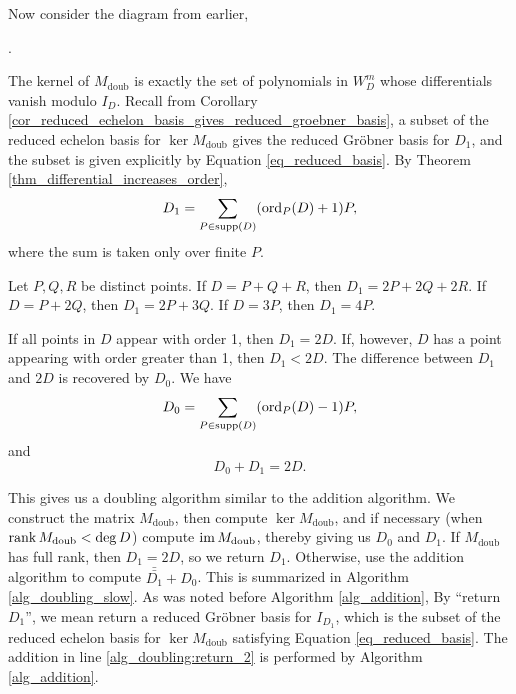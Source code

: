 Now consider the diagram from earlier,
\begin{center}
  .
\end{center}
The kernel of $M_{\text{doub}}$ is exactly the set of polynomials in $W_D^m$ whose differentials vanish modulo $I_D$.
Recall from Corollary \ref{cor_reduced_echelon_basis_gives_reduced_groebner_basis},
a subset of the reduced echelon basis for $\ker M_{\text{doub}}$ gives the reduced Gr\"obner basis for $D_1$,
and the subset is given explicitly by Equation \ref{eq_reduced_basis}.
By Theorem \ref{thm_differential_increases_order},
\[ D_1 = \sum_{P \in \operatorname{supp}(D)} (\operatorname{ord}_P(D) + 1)P, \]
where the sum is taken only over finite $P$.
\begin{example}
  Let $P,Q,R$ be distinct points.
  If $D = P + Q + R$, then $D_1 = 2P + 2Q + 2R$.
  If $D = P + 2Q$, then $D_1 = 2P + 3Q$.
  If $D = 3P$, then $D_1 = 4P$.
\end{example}

If all points in $D$ appear with order 1, then $D_1 = 2D$.
If, however, $D$ has a point appearing with order greater than 1, then $D_1 < 2D$.
The difference between $D_1$ and $2D$ is recovered by $D_0$.
We have
\[ D_0 = \sum_{P \in \operatorname{supp}(D)} (\operatorname{ord}_P(D) - 1)P, \]
and
\[ D_0 + D_1 = 2D. \]

This gives us a doubling algorithm similar to the addition algorithm.
We construct the matrix $M_{\text{doub}}$, then compute $\ker M_{\text{doub}}$, and if necessary (when $\operatorname{rank} M_{\text{doub}} < \deg D$)
compute $\operatorname{im} M_{\text{doub}}$, thereby giving us $D_0$ and $D_1$.
If $M_{\text{doub}}$ has full rank, then $D_1 = 2D$, so we return $D_1$.
Otherwise, use the addition algorithm to compute $\bar{\bar{D_1}} + D_0$.
This is summarized in Algorithm \ref{alg_doubling_slow}.
As was noted before Algorithm \ref{alg_addition},
By ``return $D_1$'', we mean return a reduced Gr\"obner basis for $I_{D_1}$,
which is the subset of the reduced echelon basis for $\ker M_{\text{doub}}$ satisfying Equation \ref{eq_reduced_basis}.
The addition in line \ref{alg_doubling:return_2} is performed by Algorithm \ref{alg_addition}.

